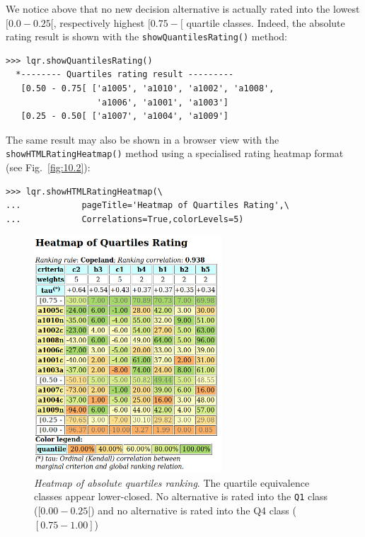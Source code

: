 We notice above that no new decision alternative is actually rated into the lowest $[0.0-0.25[$, respectively highest $[0.75- [$ quartile classes. Indeed, the absolute rating result is shown with the \texttt{showQuantilesRating()} method:
\begin{lstlisting}[caption={Absolute quartiles rating result},label=list:10.8]
>>> lqr.showQuantilesRating()
  *-------- Quartiles rating result ---------
   [0.50 - 0.75[ ['a1005', 'a1010', 'a1002', 'a1008',
                  'a1006', 'a1001', 'a1003']
   [0.25 - 0.50[ ['a1007', 'a1004', 'a1009']
\end{lstlisting}    

The same result may also be shown in a browser view with the \texttt{showHTMLRa\-tingHeatmap()} method using a specialised rating heatmap format (see Fig.~\vref{fig:10.2}): 
\begin{lstlisting}
>>> lqr.showHTMLRatingHeatmap(\
...            pageTitle='Heatmap of Quartiles Rating',\
...            Correlations=True,colorLevels=5)
\end{lstlisting}
\begin{figure}[ht]
\sidecaption[t]
 \includegraphics[width=7cm]{Figures/10-2-heatMap1.png}
\caption[Heatmap of absolute quartiles ranking]{\emph{Heatmap of absolute quartiles ranking}. The quartile equivalence classes appear lower-closed. No alternative is rated into the \texttt{Q1} class ($[0.00 - 0.25[$) and no alternative is rated into the Q4 class ($[0.75 - 1.00]$)}
\label{fig:10.2}       %
\end{figure}
	    
